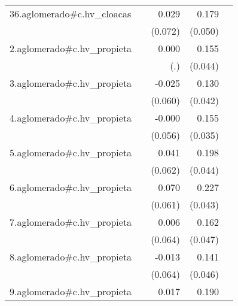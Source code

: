 {\begin{longtable}{l*{4}{D{.}{.}{-1}}}
\addlinespace
36.aglomerado#c.hv\_cloacas&                     &       0.029         &       0.179\sym{***}&                     \\
            &                     &     (0.072)         &     (0.050)         &                     \\
\addlinespace
2.aglomerado#c.hv\_propieta&                     &       0.000         &       0.155\sym{***}&                     \\
            &                     &         (.)         &     (0.044)         &                     \\
\addlinespace
3.aglomerado#c.hv\_propieta&                     &      -0.025         &       0.130\sym{**} &                     \\
            &                     &     (0.060)         &     (0.042)         &                     \\
\addlinespace
4.aglomerado#c.hv\_propieta&                     &      -0.000         &       0.155\sym{***}&                     \\
            &                     &     (0.056)         &     (0.035)         &                     \\
\addlinespace
5.aglomerado#c.hv\_propieta&                     &       0.041         &       0.198\sym{***}&                     \\
            &                     &     (0.062)         &     (0.044)         &                     \\
\addlinespace
6.aglomerado#c.hv\_propieta&                     &       0.070         &       0.227\sym{***}&                     \\
            &                     &     (0.061)         &     (0.043)         &                     \\
\addlinespace
7.aglomerado#c.hv\_propieta&                     &       0.006         &       0.162\sym{***}&                     \\
            &                     &     (0.064)         &     (0.047)         &                     \\
\addlinespace
8.aglomerado#c.hv\_propieta&                     &      -0.013         &       0.141\sym{**} &                     \\
            &                     &     (0.064)         &     (0.046)         &                     \\
\addlinespace
9.aglomerado#c.hv\_propieta&                     &       0.017         &       0.190\sym{***}&                     \\

\end{longtable}}
